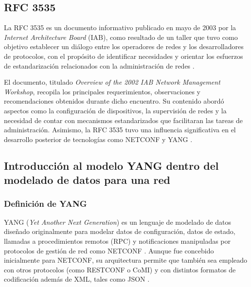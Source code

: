 \documentclass[12pt,a4paper]{article}
\begin{document}
\subsection{RFC 3535}

La RFC 3535 es un documento informativo publicado en mayo de 2003 por la \textit{Internet Architecture Board} (IAB), como resultado de un taller que tuvo como objetivo establecer un diálogo entre los operadores de redes y los desarrolladores de protocolos, con el propósito de identificar necesidades y orientar los esfuerzos de estandarización relacionados con la administración de redes \parencite{schoenwaelder2003rfc3535}.

El documento, titulado \textit{Overview of the 2002 IAB Network Management Workshop}, recopila los principales requerimientos, observaciones y recomendaciones obtenidos durante dicho encuentro. Su contenido abordó aspectos como la configuración de dispositivos, la supervisión de redes y la necesidad de contar con mecanismos estandarizados que facilitaran las tareas de administración. Asimismo, la RFC 3535 tuvo una influencia significativa en el desarrollo posterior de tecnologías como NETCONF y YANG \parencite{schoenwaelder2003rfc3535}.


\subsection{Introducción al modelo YANG dentro del modelado de datos para una red}

\subsubsection{Definición de YANG}

YANG (\textit{Yet Another Next Generation}) es un lenguaje de modelado de datos diseñado originalmente para modelar datos de configuración, datos de estado, llamadas a procedimientos remotos (RPC) y notificaciones manipuladas por protocolos de gestión de red como NETCONF \parencite{bjorklund2016rfc7950}. Aunque fue concebido inicialmente para NETCONF, su arquitectura permite que también sea empleado con otros protocolos (como RESTCONF o CoMI) y con distintos formatos de codificación además de XML, tales como JSON \parencite{bjorklund2016rfc7950}.
\end{document}
